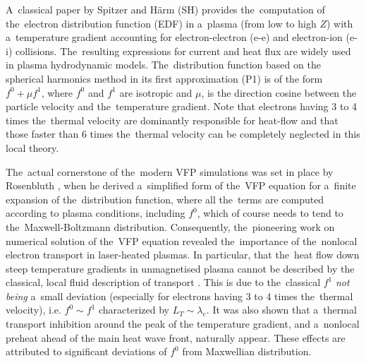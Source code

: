 \documentclass[
 aps,
 jmp,
 amsmath,amssymb,
 twocolumn,
]{revtex4-1}
\newcommand{\mfpe}{\lambda_e}
\newcommand{\Zbar}{Z}
\begin{document}
A~classical paper by Spitzer and H\"arm (SH) 
\cite{SpitzerHarm_PR1953} provides the~computation of 
the~electron distribution function (EDF) in a~plasma (from low to high $\Zbar$)
with a~temperature gradient accounting for electron-electron (e-e) and 
electron-ion (e-i) collisions.
The~resulting expressions for current and heat flux are widely used in plasma 
hydrodynamic models.
The~distribution function based on the spherical harmonics method in 
its first approximation (P1) \cite{Jeans_MNRAS1917} is of the form 
$f^0+\mu f^1$, where $f^0$ and $f^1$ 
are isotropic and $\mu$, is the direction cosine between the particle 
velocity and the~temperature gradient. 
Note that electrons having
3 to 4 times the~thermal velocity are dominantly responsible for heat-flow
and that those faster than 6 times the~thermal velocity can be completely 
neglected in this local theory.

The~actual cornerstone of the~modern VFP simulations was set in place
by Rosenbluth \cite{Rosenbluth_PR1957}, when he derived a~simplified form 
of the~VFP equation for a~finite expansion of the~distribution function,
where all the~terms are computed according to plasma conditions, including
$f^0$, which of course needs to tend to the~Maxwell-Boltzmann distribution.
Consequently, the~pioneering work on numerical solution of the~VFP equation
\cite{Bell_1981_83, Matte_1982_86} revealed the~importance of the~nonlocal
electron transport in laser-heated plasmas. 
In particular, that the~heat flow down steep temperature gradients in 
unmagnetised plasma cannot be described by the classical, local fluid
description of transport \cite{SpitzerHarm_PR1953, Braginskii_1965_3}.
This is due to the~classical $f^1$ \textit{not being} a~small deviation 
(especially for electrons having 3 to 4 times the~thermal velocity), 
i.e. $f^0\sim f^1$ characterized by $L_T\sim\mfpe$.
It was also shown that a~thermal transport inhibition \cite{Bell_1981_83} 
around the peak of the temperature gradient, and a~nonlocal preheat 
ahead of the main heat wave front, naturally appear. 
These effects are attributed to significant deviations 
of $f^0$ from Maxwellian distribution.
\end{document}
